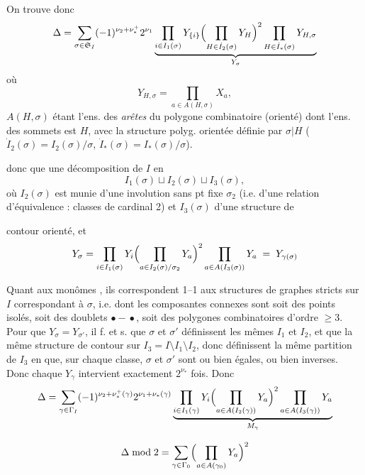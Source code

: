 \documentclass[11pt,a4paper]{article}
\begin{document}
On trouve donc
\[
  \Delta = \sum_{\sigma \in \mathfrak{S}_I} (-1)^{\nu_2 + \nu_*^+} 2^{\nu_1}
  \underbrace{\prod_{i \in I_1(\sigma)} Y_{\{i\}}
  \Bigl(\prod_{H \in \dot I_2(\sigma)} Y_H\Bigr)^2
  \prod_{H \in \dot I_*(\sigma)} Y_{H,\sigma}}_{Y_\sigma}
\]
où
\[
  Y_{H,\sigma} = \prod_{a \in A(H,\sigma)} X_a ,
\]
$A(H, \sigma)$ étant l'ens. des \emph{arêtes} du polygone combinatoire (orienté) dont l'ens. des sommets est $H$, avec la structure polyg. orientée définie par $\sigma|H$ ($\dot I_2(\sigma) = I_2(\sigma)/\sigma$, $\dot I_*(\sigma) = I_*(\sigma)/\sigma$).

   donc que   une décomposition de $I$ en
\[
  I_1(\sigma) \sqcup I_2(\sigma) \sqcup I_3(\sigma),
\]
où $I_2(\sigma)$ est munie d'une involution sans pt fixe $\sigma_2$ (i.e. d'une relation d'équivalence : classes de cardinal 2)  et $I_3(\sigma)$ d'une structure de

contour orienté, et
\[
  Y_\sigma = \prod_{i \in I_1(\sigma)} Y_i
  \Bigl(\prod_{a \in I_2(\sigma)/\sigma_2} Y_a\Bigr)^2
  \prod_{a \in A(I_3(\sigma))} Y_a
  \;=\; Y_{\gamma(\sigma)}
\]

Quant aux monômes , ils correspondent 1--1 aux structures de graphes \add{$\gamma$} stricts sur $I$ correspondant à $\sigma$, i.e. dont les composantes connexes sont soit des points isolés, soit des  doublets $\bullet\!\!-\!\!\bullet$, soit des polygones combinatoires d'ordre  $\geq 3$. Pour que  $Y_\sigma = Y_{\sigma'}$, il f. et s. que $\sigma$ et $\sigma'$ définissent les mêmes $I_1$ et $I_2$, et que \struck{\ill{}} la même structure  de contour sur $I_3 = I \setminus I_1 \setminus I_2$, donc   définissent la même partition de $I_3$ en   que, sur chaque classe, $\sigma$ et $\sigma'$ sont ou bien égales, ou bien inverses. Donc chaque $Y_\gamma$ intervient exactement $2^{\nu_*}$ fois. Donc
\[
  \Delta = \sum_{\gamma \in \Gamma_I} (-1)^{\nu_2 + \nu_*^+(\gamma)}
  2^{\nu_1 + \nu_*(\gamma)}
  \underbrace{\prod_{i \in I_1(\gamma)} Y_i
  \Bigl(\prod_{a \in A(I_2(\gamma))} Y_a\Bigr)^2
  \prod_{a \in A(I_3(\gamma))} Y_a}_{M_\gamma}
\]

\[
  \Delta \bmod 2 = \sum_{\gamma \in \Gamma_0}
  \Bigl(\prod_{a \in A(\gamma_0)} Y_a\Bigr)^2
\]
\end{document}
